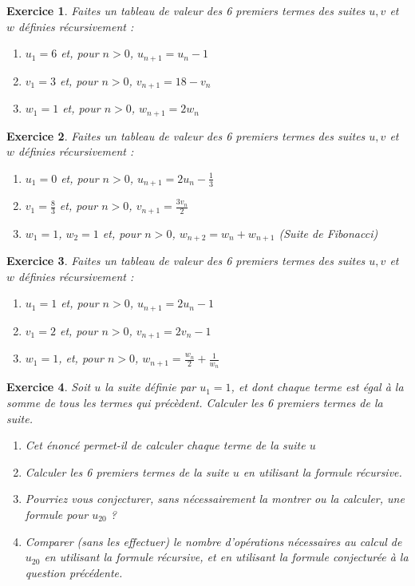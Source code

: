\documentclass[10pt,a4paper]{article}
\newtheorem{exo}{Exercice}
\begin{document}
\begin{exo}
    Faites un tableau de valeur des 6 premiers termes des suites $u,v$ et $w$ définies récursivement :
    \begin{enumerate}
        \item $u_1=6$ et, pour $n> 0$, $u_{n+1}=u_n-1$
        \item $v_1=3$ et, pour $n> 0$, $v_{n+1}=18-v_n$
        \item $w_1=1$ et, pour $n> 0$, $w_{n+1}=2w_{n}$ 
    \end{enumerate}
\end{exo}

\begin{exo}
    Faites un tableau de valeur des 6 premiers termes des suites $u,v$ et $w$ définies récursivement :
    \begin{enumerate}
        \item $u_1=0$ et, pour $n> 0$, $u_{n+1}=2u_n - \frac{1}{3}$
        \item $v_1=\frac{8}{3}$ et, pour $n> 0$, $v_{n+1}=\frac{3v_n}{2}$
        \item $w_1=1$, $w_2=1$ et, pour $n> 0$, $w_{n+2}=w_{n}+w_{n+1}$ (Suite de Fibonacci)
    \end{enumerate}
\end{exo}

\begin{exo}
    Faites un tableau de valeur des 6 premiers termes des suites $u,v$ et $w$ définies récursivement :
    \begin{enumerate}
        \item $u_1=1$ et, pour $n> 0$, $u_{n+1}=2u_n-1$
        \item $v_1=2$ et, pour $n> 0$, $v_{n+1}=2v_n-1$
        \item $w_1=1$, et, pour $n> 0$, $w_{n+1}=\frac{w_{n}}{2}+\frac{1}{w_{n}}$
    \end{enumerate}
\end{exo}

\begin{exo}
    Soit $u$ la suite définie par $u_1=1$, et dont chaque terme est égal à la somme de tous les termes qui précèdent. Calculer les 6 premiers termes de la suite.
    \begin{enumerate}
        \item Cet énoncé permet-il de calculer chaque terme de la suite $u$
        \item Calculer les 6 premiers termes de la suite $u$ en utilisant la formule récursive.
        \item Pourriez vous conjecturer, sans nécessairement la montrer ou la calculer, une formule pour $u_{20}$ ?
        \item Comparer (sans les effectuer) le nombre d'opérations nécessaires au calcul de $u_{20}$ en utilisant la formule récursive, et en utilisant la formule conjecturée à la question précédente.
    \end{enumerate}
\end{exo}
\end{document}
